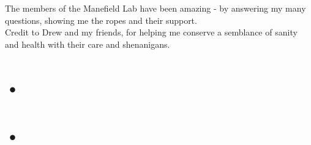 \documentclass[twoside]{article}
\begin{document}
The members of the Manefield Lab have been amazing -  by answering my many questions, showing me the ropes and their support.\\ 

Credit to Drew and my friends, for helping me conserve a semblance of sanity and health with their care and shenanigans.

\newpage
\thispagestyle{plain}
\tableofcontents

\newpage


\section{•}
\thispagestyle{plain}
\listoffigures

\newpage
\section{•}
\thispagestyle{plain}
\listoftables

\newpage
\end{document}
